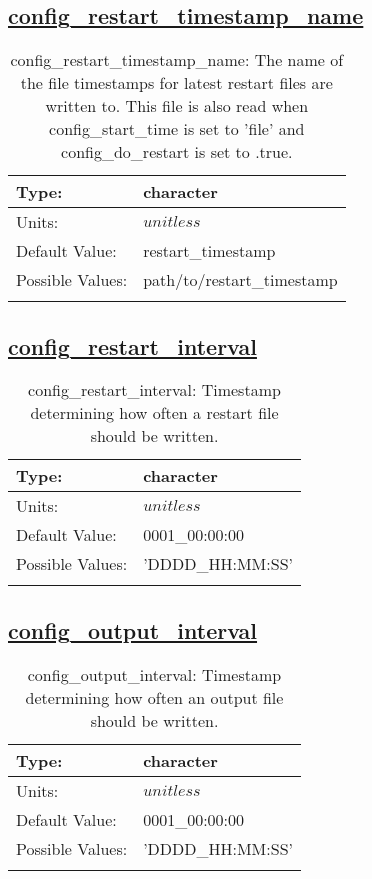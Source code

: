 \subsection[config\_restart\_timestamp\_name]{\hyperref[sec:nm_tab_io]{config\_restart\_timestamp\_name}}
\label{subsec:nm_sec_config_restart_timestamp_name}
\begin{center}
\begin{longtable}{| p{2.0in} | p{4.0in} |}
    \hline
    Type: & character \\
    \hline
    Units: & $unitless$ \\
    \hline
    Default Value: & restart\_timestamp \\
    \hline
    Possible Values: & path/to/restart\_timestamp \\
    \hline
    \caption{config\_restart\_timestamp\_name: The name of the file timestamps for latest restart files are written to. This file is also read when config\_start\_time is set to 'file' and config\_do\_restart is set to .true.}
\end{longtable}
\end{center}
\subsection[config\_restart\_interval]{\hyperref[sec:nm_tab_io]{config\_restart\_interval}}
\label{subsec:nm_sec_config_restart_interval}
\begin{center}
\begin{longtable}{| p{2.0in} | p{4.0in} |}
    \hline
    Type: & character \\
    \hline
    Units: & $unitless$ \\
    \hline
    Default Value: & 0001\_00:00:00 \\
    \hline
    Possible Values: & 'DDDD\_HH:MM:SS' \\
    \hline
    \caption{config\_restart\_interval: Timestamp determining how often a restart file should be written.}
\end{longtable}
\end{center}
\subsection[config\_output\_interval]{\hyperref[sec:nm_tab_io]{config\_output\_interval}}
\label{subsec:nm_sec_config_output_interval}
\begin{center}
\begin{longtable}{| p{2.0in} | p{4.0in} |}
    \hline
    Type: & character \\
    \hline
    Units: & $unitless$ \\
    \hline
    Default Value: & 0001\_00:00:00 \\
    \hline
    Possible Values: & 'DDDD\_HH:MM:SS' \\
    \hline
    \caption{config\_output\_interval: Timestamp determining how often an output file should be written.}
\end{longtable}
\end{center}

